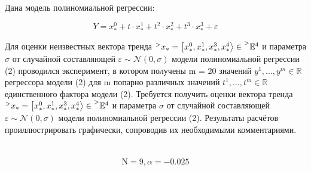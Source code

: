 \newpage

\section*{}

Дана модель полиномиальной регрессии:

\begin{equation}
	Y = x^0_* + t \cdot x^1_* + t^2 \cdot x^2_* + t^3 \cdot x^3_* + \varepsilon
\end{equation}

Для оценки неизвестных вектора тренда 
$\prescript{>}{}{x_*} = \left[ x^0_*, x^1_*, x^3_*, x^4_* \right> \in \prescript{>}{}{\mathbb{E}^{4}}$
и параметра $\sigma$ от случайной составляющей $\varepsilon \sim \mathcal{N}(0, \sigma)$
модели полиномиальной регрессии (2) проводился эксперимент, в котором получены m = 20 значений
$y^1, \dots, y^m \in \mathbb{R}$  регрессора модели (2) для m попарно различных значений $t^1, \dots, t^m \in \mathbb{R}$ 
единственного фактора модели (2). Требуется получить оценки вектора тренда 
$\prescript{>}{}{x_*} = \left[ x^0_*, x^1_*, x^3_*, x^4_* \right> \in \prescript{>}{}{\mathbb{E}^{4}}$
и параметра $\sigma$ от случайной составляющей $\varepsilon \sim \mathcal{N}(0, \sigma)$ модели полиномиальной регрессии (2). 
Результаты расчётов проиллюстрировать графически, сопроводив их необходимыми комментариями.

\vspace{-0.75\baselineskip}

\section*{}

\vspace{-0.75\baselineskip}

\begin{equation*}
    \textrm{N} = 9, \alpha = -0.025
\end{equation*}

